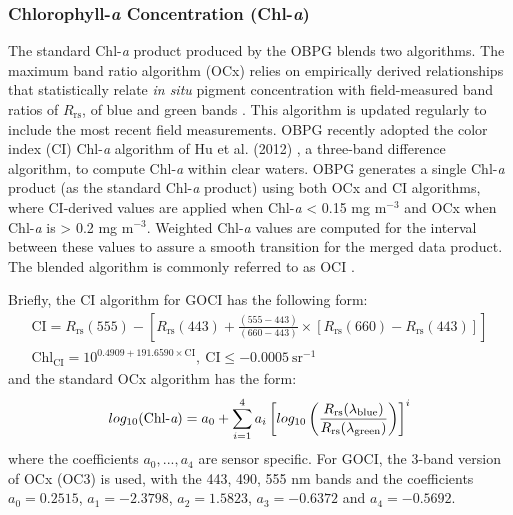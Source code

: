 \documentclass[remotesensing,article,submit,moreauthors,pdftex,10pt,a4paper]{Definitions/mdpi}
\begin{document}
\subsubsection{Chlorophyll-{\it a} Concentration (Chl-{\it a})}
The standard Chl-{\it a} product produced by the OBPG blends two algorithms. The maximum band ratio algorithm (OCx) relies on empirically derived relationships that statistically relate {\it in situ} pigment concentration with field-measured band ratios of $R_\text{rs}$, of blue and green bands \cite{OReilly1998_Chl}. This algorithm is updated regularly to include the most recent field measurements. OBPG recently adopted the color index (CI) Chl-{\it a} algorithm of Hu et al. (2012) \cite{Hu2012}, a three-band difference algorithm, to compute Chl-{\it a} within clear waters. OBPG generates a single Chl-{\it a} product (as the standard Chl-{\it a} product) using both OCx and CI algorithms, where CI-derived values are applied when Chl-{\it a} < 0.15 mg m$^{-3}$ and OCx when Chl-{\it a} is > 0.2 mg m$^{-3}$. Weighted Chl-{\it a} values are computed for the interval between these values to assure a smooth transition for the merged data product. The blended algorithm is commonly referred to as OCI \cite{Hu2012}. 

Briefly, the CI algorithm for GOCI has the following form: 
\begin{equation}
\begin{split}
  \text{CI}=R_\text{rs}(555)-\left[R_\text{rs}(443)+\frac{(555-443)}{(660-443)}\times [R_\text{rs}(660)-R_\text{rs}(443)]\right]\\
  \text{Chl}_{\text{CI}} = 10^{0.4909+191.6590\times \text{CI}},~\text{CI}\leq-0.0005~\text{sr}^{-1}
\end{split}  
\end{equation}
\noindent and the standard OCx algorithm has the form: 
\begin{equation}
  log_{10}(\text{Chl-{\it a}}) = a_0 + \sum_{i=1}^4 a_i \left[log_{10}\left(\frac{R_\text{rs}(\lambda_\text{blue})}{R_\text{rs}(\lambda_\text{green})}\right)\right]^i
\end{equation}
where the coefficients $a_0,...,a_4$ are sensor specific. For GOCI, the 3-band version of OCx (OC3) is used, with the 443, 490, 555 nm bands and the coefficients $a_0=0.2515$, $a_1=-2.3798$, $a_2=1.5823$, $a_3=-0.6372$ and $a_4=-0.5692$. 
\end{document}
